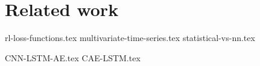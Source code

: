 
\chapter{Related work}\label{RelatedWorkMain}

{rl-loss-functions.tex}
{multivariate-time-series.tex}
{statistical-vs-nn.tex}

{CNN-LSTM-AE.tex}
{CAE-LSTM.tex}